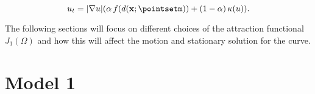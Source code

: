 \begin{tcolorbox}[title=General level set model]
\begin{equation}
    u_t = |\nabla u|(\alpha \, f(d(\mathbf{x};\pointsetm)) + (1-\alpha)\, \kappa(u)).
    \label{eq:model1-pde}
\end{equation} 
\end{tcolorbox}

The following sections will focus on different choices of the attraction functional $J_1(\Omega)$ and how this will affect the motion and stationary solution for the curve.
\clearpage
\section{Model 1} 
